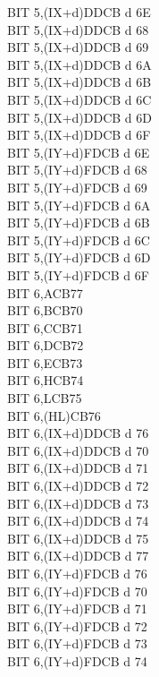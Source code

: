 \documentclass[12pt,twoside,openright,a4paper]{book}
\begin{document}
\begin{multicols}{3}
{\begin{tabbing}
		BIT 5,(IX+d)\>DDCB d 6E\\
		BIT 5,(IX+d)\UNDOC\>DDCB d 68\\
		BIT 5,(IX+d)\UNDOC\>DDCB d 69\\
		BIT 5,(IX+d)\UNDOC\>DDCB d 6A\\
		BIT 5,(IX+d)\UNDOC\>DDCB d 6B\\
		BIT 5,(IX+d)\UNDOC\>DDCB d 6C\\
		BIT 5,(IX+d)\UNDOC\>DDCB d 6D\\
		BIT 5,(IX+d)\UNDOC\>DDCB d 6F\\
		BIT 5,(IY+d)\>FDCB d 6E\\
		BIT 5,(IY+d)\UNDOC\>FDCB d 68\\
		BIT 5,(IY+d)\UNDOC\>FDCB d 69\\
		BIT 5,(IY+d)\UNDOC\>FDCB d 6A\\
		BIT 5,(IY+d)\UNDOC\>FDCB d 6B\\
		BIT 5,(IY+d)\UNDOC\>FDCB d 6C\\
		BIT 5,(IY+d)\UNDOC\>FDCB d 6D\\
		BIT 5,(IY+d)\UNDOC\>FDCB d 6F\\
		BIT 6,A\>CB77\\
		BIT 6,B\>CB70\\
		BIT 6,C\>CB71\\
		BIT 6,D\>CB72\\
		BIT 6,E\>CB73\\
		BIT 6,H\>CB74\\
		BIT 6,L\>CB75\\
		BIT 6,(HL)\>CB76\\
		BIT 6,(IX+d)\>DDCB d 76\\
		BIT 6,(IX+d)\UNDOC\>DDCB d 70\\
		BIT 6,(IX+d)\UNDOC\>DDCB d 71\\
		BIT 6,(IX+d)\UNDOC\>DDCB d 72\\
		BIT 6,(IX+d)\UNDOC\>DDCB d 73\\
		BIT 6,(IX+d)\UNDOC\>DDCB d 74\\
		BIT 6,(IX+d)\UNDOC\>DDCB d 75\\
		BIT 6,(IX+d)\UNDOC\>DDCB d 77\\
		BIT 6,(IY+d)\>FDCB d 76\\
		BIT 6,(IY+d)\UNDOC\>FDCB d 70\\
		BIT 6,(IY+d)\UNDOC\>FDCB d 71\\
		BIT 6,(IY+d)\UNDOC\>FDCB d 72\\
		BIT 6,(IY+d)\UNDOC\>FDCB d 73\\
		BIT 6,(IY+d)\UNDOC\>FDCB d 74\\

\end{tabbing}}
\end{multicols}
\end{document}
